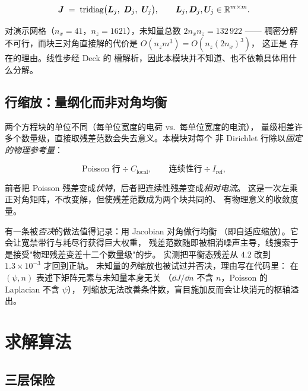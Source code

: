 \begin{equation}
\bm{J} \;=\; \operatorname{tridiag}\bigl(\bm{L}_j,\ \bm{D}_j,\ \bm{U}_j\bigr),
\qquad \bm{L}_j,\bm{D}_j,\bm{U}_j \in \mathbb{R}^{m\times m}.
\label{eq:dd-block-structure}
\end{equation}

对演示网格（$n_x=41$，$n_z=1621$），未知量总数 $2n_xn_z = 132\,922$ ——
稠密分解不可行，而块三对角直接解的代价是 $O(n_zm^{3})=O(n_z(2n_x)^3)$，
这正是  存在的理由。线性步经 Deck 的
 槽解析，因此本模块并不知道、也不依赖具体用什么分解。

\subsection{行缩放：量纲化而非对角均衡}
\label{sec:dd-scaling}

两个方程块的单位不同（每单位宽度的电荷 vs.\ 每单位宽度的电流），
量级相差许多个数量级，直接取残差范数会失去意义。本模块对每个
非 Dirichlet 行除以\emph{固定的物理参考量}：

\begin{equation}
\text{Poisson 行} \div C_{\text{local}},
\qquad
\text{连续性行} \div I_{\text{ref}},
\label{eq:dd-row-scaling}
\end{equation}

前者把 Poisson 残差变成\emph{伏特}，后者把连续性残差变成\emph{相对电流}。
这是一次左乘正对角矩阵，不改变解，但使残差范数成为两个块共同的、
有物理意义的收敛度量。

有一条被\emph{否决}的做法值得记录：用 Jacobian 对角做行均衡
（即自适应缩放）。它会让宽禁带行与耗尽行获得巨大权重，
残差范数随即被相消噪声主导，线搜索于是接受"物理残差变差十二个数量级"的步。
实测把平衡态残差从 $4.2$ 改到 $1.3\times10^{-3}$ 才回到正轨。
未知量的\emph{列}缩放也被试过并否决，理由写在代码里：
在 $(\psi,n)$ 表述下矩阵元素与未知量本身无关
（$\dd J/\dd n$ 不含 $n$，Poisson 的 Laplacian 不含 $\psi$），
列缩放无法改善条件数，盲目施加反而会让块消元的枢轴溢出。

\section{求解算法}
\label{sec:dd-solver}

\subsection{三层保险}
\label{sec:dd-three-layers}

